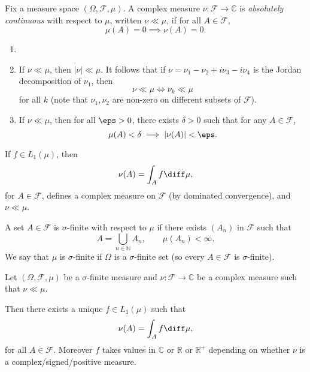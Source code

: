 \documentclass[12pt]{article}
\begin{document}

\begin{definition}
	Fix a measure space $(\Omega, \mathcal{F}, \mu)$. A complex measure $\nu : \mathcal{F} \to \mathbb{C}$ is \emph{absolutely continuous} with respect to $\mu$, written $\nu \ll \mu$, if for all $A \in \mathcal{F}$,
	\[
	\mu(A) = 0 \implies \nu(A) = 0.
	\]
\end{definition}

\begin{remark}
	\begin{enumerate}
		\item[]
		\item If $\nu \ll \mu$, then $|\nu| \ll \mu$. It follows that if $\nu = \nu_1 - \nu_2 + i \nu_3 - i \nu_4$ is the Jordan decomposition of $\nu_1$, then 
			\[
			\nu \ll \mu \iff \nu_k \ll \mu
			\]
			for all $k$ (note that $\nu_1, \nu_2$ are non-zero on different subsets of $\mathcal{F}$).
		\item If $\nu \ll \mu$, then for all $\eps > 0$, there exists $\delta > 0$ such that for any $A \in \mathcal{F}$,
			\[
			\mu(A) < \delta \implies |\nu(A)| < \eps.
			\]
	\end{enumerate}
\end{remark}

\begin{exbox}
	If $f \in L_1(\mu)$, then
	\[
	\nu(A) = \int_A f \diff \mu,
	\]
	for $A \in \mathcal{F}$, defines a complex measure on $\mathcal{F}$ (by dominated convergence), and $\nu \ll \mu$.
\end{exbox}

\begin{definition}
	A set $A \in \mathcal{F}$ is $\sigma$-finite with respect to $\mu$ if there exists $(A_n)$ in $\mathcal{F}$ such that
	\[
	A = \bigcup_{n \in \mathbb{N}} A_n, \qquad \mu(A_n) < \infty.
	\]
	We say that $\mu$ is $\sigma$-finite if $\Omega$ is a $\sigma$-finite set (so every $A \in \mathcal{F}$ is $\sigma$-finite).
\end{definition}

\begin{theorem}
	Let $(\Omega, \mathcal{F}, \mu)$ be a $\sigma$-finite measure and $\nu : \mathcal{F} \to \mathbb{C}$ be a complex measure such that $\nu \ll \mu$.

	Then there exists a unique $f \in L_1(\mu)$ such that
	\[
	\nu(A) = \int_A f \diff \mu,
	\]
	for all $A \in \mathcal{F}$. Moreover $f$ takes values in $\mathbb{C}$ or $\mathbb{R}$ or $\mathbb{R}^+$ depending on whether $\nu$ is a complex/signed/positive measure.
\end{theorem}
\end{document}
